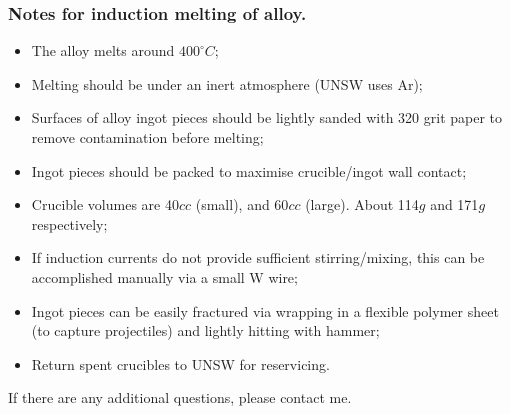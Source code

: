 \subsubsection{Notes for induction melting of \MgZnCa alloy.}
\begin{itemize}
\item The \MgZnCa alloy melts around $400^{\circ}C$;
\item Melting should be under an inert atmosphere (UNSW uses Ar);
\item Surfaces of alloy ingot pieces should be lightly sanded with 320 grit paper to remove contamination before melting;
\item Ingot pieces should be packed to maximise crucible/ingot wall contact;
\item Crucible volumes are 40$cc$ (small), and 60$cc$ (large). About 114$g$ and 171$g$ respectively;
\item If induction currents do not provide sufficient stirring/mixing, this can be accomplished manually via a small W wire; 
\item Ingot pieces can be easily fractured via wrapping in a flexible polymer sheet (to capture projectiles) and lightly hitting with hammer;
\item Return spent crucibles to UNSW for reservicing. 
\end{itemize}

If there are any additional questions, please contact me. 
